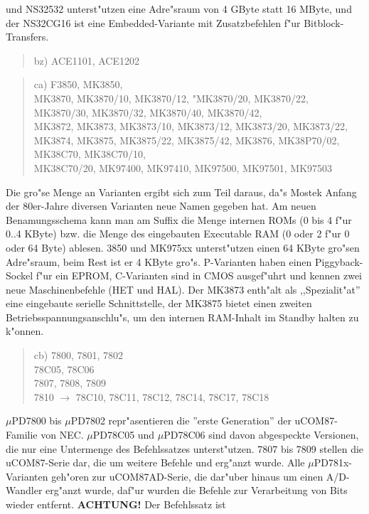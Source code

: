 \documentclass[12pt,a4paper,twoside]{report}
\newcommand{\bb}[1]{{\bf #1}}
\begin{document}
und NS32532 unterst"utzen eine Adre"sraum von 4 GByte statt 16 MByte,
und der NS32CG16 ist eine Embedded-Variante mit Zusatzbefehlen f"ur
Bitblock-Transfers.
\begin{quote}
bz) ACE1101, ACE1202
\end{quote}
\begin{quote}
ca) F3850, MK3850, \\
    MK3870, MK3870/10, MK3870/12, "MK3870/20, MK3870/22, \\
    MK3870/30, MK3870/32, MK3870/40, MK3870/42, \\
    MK3872, MK3873, MK3873/10, MK3873/12, MK3873/20, MK3873/22, \\
    MK3874, MK3875, MK3875/22, MK3875/42, MK3876, MK38P70/02, \\
    MK38C70, MK38C70/10, \\
    MK38C70/20, MK97400, MK97410, MK97500, MK97501, MK97503
\end{quote}
Die gro"se Menge an Varianten ergibt sich zum Teil daraus, da"s
Mostek Anfang der 80er-Jahre diversen Varianten neue Namen gegeben
hat. Am neuen Benamungsschema kann man am Suffix die Menge internen
ROMs (0 bis 4 f"ur 0..4 KByte) bzw. die Menge des eingebauten 
Executable RAM (0 oder 2 f"ur 0 oder 64 Byte) ablesen.  3850 und
MK975xx unterst"utzen einen 64 KByte gro"sen Adre"sraum, beim Rest ist
er 4 KByte gro"s. P-Varianten haben einen Piggyback-Sockel f"ur ein
EPROM, C-Varianten sind in CMOS ausgef"uhrt und kennen zwei
neue Maschinenbefehle (HET und HAL).  Der MK3873 enth"alt als
,,Spezialit"at'' eine eingebaute serielle Schnittstelle, der
MK3875 bietet einen zweiten Betriebsspannungsanschlu"s, um den
internen RAM-Inhalt im Standby halten zu k"onnen.
\begin{quote}
cb) 7800, 7801, 7802 \\
78C05, 78C06 \\
7807, 7808, 7809 \\
7810 $\rightarrow$ 78C10, 78C11, 78C12, 78C14, 78C17, 78C18
\end{quote}
$\mu$PD7800 bis $\mu$PD7802 repr"asentieren die ''erste Generation'' der
uCOM87-Familie von NEC.  $\mu$PD78C05 und $\mu$PD78C06 sind davon abgespeckte
Versionen, die nur eine Untermenge des Befehlssatzes unterst"utzen.  7807
bis 7809 stellen die uCOM87-Serie dar, die um weitere Befehle und erg"anzt
wurde.  Alle $\mu$PD781x-Varianten geh"oren zur uCOM87AD-Serie, die dar"uber
hinaus um einen A/D-Wandler erg"anzt wurde, daf"ur wurden die Befehle zur
Verarbeitung von Bits wieder entfernt.  \bb{ACHTUNG!} Der Befehlssatz ist
\end{document}
